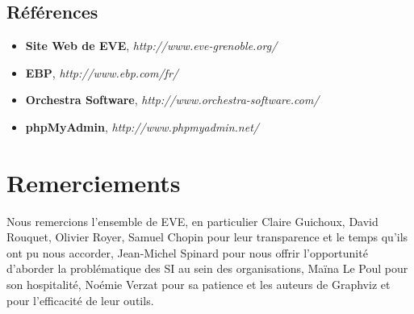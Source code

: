 \newpage

\subsection{Références}

\begin{itemize}
\item \textbf{Site Web de EVE}, \textit{http://www.eve-grenoble.org/}
\item \textbf{EBP}, \textit{http://www.ebp.com/fr/}
\item \textbf{Orchestra Software}, \textit{http://www.orchestra-software.com/}
\item \textbf{phpMyAdmin}, \textit{http://www.phpmyadmin.net/}
\end{itemize}

\section*{Remerciements}

Nous remercions l'ensemble de EVE, en particulier Claire Guichoux, David Rouquet,
Olivier Royer, Samuel Chopin pour leur transparence et le temps qu'ils ont pu
nous accorder, Jean-Michel Spinard pour nous offrir l'opportunité d'aborder
la problématique des SI au sein des organisations,
Maïna Le Poul pour son hospitalité, Noémie Verzat pour sa patience et
les auteurs de Graphviz et \LaTeXe pour l'efficacité de leur outils.